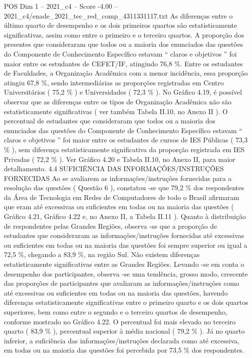 \begin{textsample}{POS Dim 1 – 2021\_c4 – Score -4.00 – 2021\_c4/enade\_2021\_tec\_red\_comp\_4311331117.txt}
As diferenças entre o último quarto de desempenho e os dois primeiros quartos são estatisticamente significativas, assim como entre o primeiro e o terceiro quartos.
A proporção dos presentes que consideraram que todos ou a maioria dos enunciados das questões do Componente de Conhecimento Específico estavam “ claros e objetivos ” foi maior entre os estudantes de CEFET/IF, atingindo 76,8 \%.
Entre os estudantes de Faculdades, a Organização Acadêmica com a menor incidência, essa proporção atingiu 67,8 \%, sendo intermediárias as proporções registradas em Centro Universitários ( 75,2 \% ) e Universidades ( 72,3 \% ).
No Gráfico 4.19, é possível observar que as diferenças entre os tipos de Organização Acadêmica não são estatisticamente significativas ( ver também Tabela II.10, no Anexo II ).
O percentual de estudantes que consideraram que todos ou a maioria dos enunciados das questões do Componente de Conhecimento Específico estavam “ claros e objetivos ” foi maior entre os estudantes de cursos de IES Públicas ( 73,3 \% ), sem diferença estatisticamente significativa da proporção registrada em IES Privadas ( 72,2 \% ).
Ver Gráfico 4.20 e Tabela II.10, no Anexo II, para maior detalhamento. 4.4 SUFICIÊNCIA DAS INFORMAÇÕES/INSTRUÇÕES FORNECIDAS Ao se avaliarem as informações/instruções fornecidas para a resolução das questões ( Questão 6 ), constatou -se que 79,2 \% dos respondentes da Área de Tecnologia em Redes de Computadores de todo o Brasil afirmaram que eram até excessivas ou suficientes em todas ou na maioria das questões ( Gráfico 4.21, Gráfico 4.22 e, no Anexo II, a Tabela II.11 ).
Quanto à distribuição de respondentes pelas Grandes Regiões, observa -se que a proporção de estudantes que consideraram as informações/instruções fornecidas até excessivas ou suficientes em todas ou na maioria das questões foi sempre superior ou igual a 72,5 \%, chegando a 83,9 \%, na região Sul.
Não existem diferenças estatisticamente significativas entre as Grandes Regiões.
Levando -se em conta o desempenho dos participantes, observa -se uma tendência, grosso modo, crescente das proporções de participantes que avaliaram as informações/instruções como até excessivas ou suficientes em todas ou na maioria das questões, havendo diferenças estatisticamente significativas entre o primeiro quarto e os dois quartos superiores, bem como entre o segundo e o terceiro quartos de desempenho, conforme mostrado no Gráfico 4.22.
O percentual foi mais elevado no terceiro quarto ( 83,9 \% ), percentual superior à média nacional ( 79,2 \% ).
Já no quarto inferior, a suficiência das informações/instruções declarada como até excessiva, em todas ou na maioria das questões foi percebida por 73,5 \% dos respondentes.

\end{textsample}
